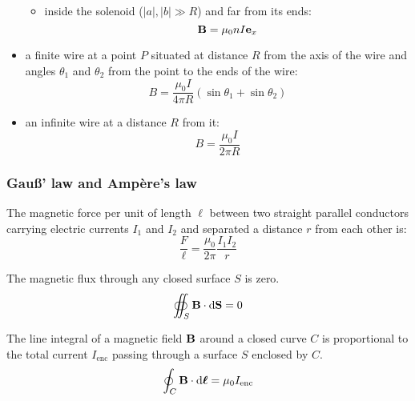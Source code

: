 \documentclass[../../../main.tex]{subfiles}
\begin{document}
\begin{multicols}{2}
\begin{prop}
\begin{itemize}
\begin{itemize}
\begin{center}
                      \begin{minipage}{\linewidth}
                        \centering
                        
                      \end{minipage}
                    \end{center}
              \item inside the solenoid ($|a|,|b|\gg R$) and far from its ends: $$\boldsymbol{\mathrm{B}}=\mu_0 nI\boldsymbol{\mathrm{e}}_x$$
            \end{itemize}
      \item a finite wire at a point $P$ situated at distance $R$ from the axis of the wire and angles $\theta_1$ and $\theta_2$ from the point to the ends of the wire: $$B=\frac{\mu_0I}{4\pi R}(\sin\theta_1+\sin\theta_2)$$
            \begin{center}
              \begin{minipage}{\linewidth}
                \centering
                
              \end{minipage}
            \end{center}
      \item an infinite wire at a distance $R$ from it: $$B=\frac{\mu_0I}{2\pi R}$$
    \end{itemize}
  \end{prop}
  \subsubsection{Gau\ss' law and Ampère's law}
  \begin{prop}
    The magnetic force per unit of length $\ell$ between two straight parallel conductors carrying electric currents $I_1$ and $I_2$ and separated a distance $r$ from each other is: $$\frac{F}{\ell}=\frac{\mu_0}{2\pi}\frac{I_1I_2}{r}$$
  \end{prop}
  \begin{law}
    The magnetic flux through any closed surface $S$ is zero.
    $$\oiint_S\boldsymbol{\mathrm{B}}\cdot\dd\boldsymbol{\mathrm{S}}=0$$
  \end{law}
  \begin{law}
    The line integral of a magnetic field $\boldsymbol{\mathrm{B}}$ around a closed curve $C$ is proportional to the total current $I_\text{enc}$ passing through a surface $S$ enclosed by $C$.
    $$\oint_C\boldsymbol{\mathrm{B}}\cdot\dd\boldsymbol{\mathrm{\ell}}=\mu_0I_\text{enc}$$
  \end{law}

\end{multicols}
\end{document}
